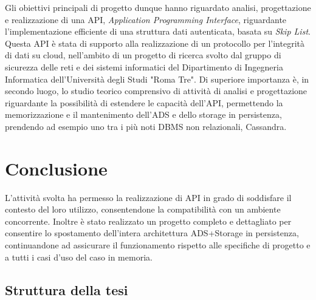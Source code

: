 		Gli obiettivi principali di progetto dunque hanno riguardato analisi, progettazione e realizzazione di una API, \textit{Application Programming Interface}, riguardante l'implementazione efficiente di una struttura dati autenticata, basata su \textit{Skip List}. Questa API è stata di supporto alla realizzazione di un protocollo per l'integrità di dati su cloud, nell'ambito di un progetto di ricerca svolto dal gruppo di sicurezza delle reti e dei sistemi informatici del Dipartimento di Ingegneria Informatica dell'Università degli Studi "Roma Tre". Di superiore importanza è, in secondo luogo, lo studio teorico comprensivo di attività di analisi e progettazione riguardante la possibilità di estendere le capacità dell'API, permettendo la memorizzazione e il mantenimento dell'ADS e dello storage in persistenza, prendendo ad esempio uno tra i più noti DBMS non relazionali, Cassandra.

\section{Conclusione}
	
	L'attività svolta ha permesso la realizzazione di API in grado di soddisfare il contesto del loro utilizzo, consentendone la compatibilità con un ambiente concorrente. Inoltre è stato realizzato un progetto completo e dettagliato per consentire lo spostamento dell'intera architettura ADS+Storage in persistenza, continuandone ad assicurare il funzionamento rispetto alle specifiche di progetto e a tutti i casi d'uso del caso in memoria.

	\subsection{Struttura della tesi}
	

